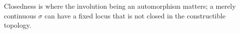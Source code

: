 \begin{remark}\label{dm-0004}
Closedness is where the involution being an automorphism matters; a merely continuous $\sigma$ can have a fixed locus that is not closed in the constructible topology.
\end{remark}